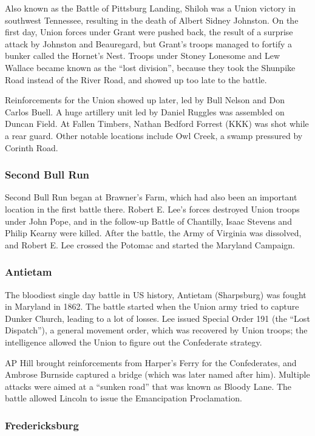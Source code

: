 Also known as the Battle of Pittsburg Landing, Shiloh was a Union victory in southwest Tennessee,
resulting in the death of Albert Sidney Johnston.
On the first day, Union forces under Grant were pushed back,
the result of a surprise attack by Johnston and Beauregard,
but Grant's troops managed to fortify a bunker called the Hornet's Nest.
Troops under Stoney Lonesome and Lew Wallace became known as the ``lost division'',
because they took the Shunpike Road instead of the River Road,
and showed up too late to the battle.

Reinforcements for the Union showed up later, led by Bull Nelson and Don Carlos Buell.
A huge artillery unit led by Daniel Ruggles was assembled on Duncan Field.
At Fallen Timbers, Nathan Bedford Forrest (KKK) was shot while a rear guard.
Other notable locations include Owl Creek, a swamp pressured by Corinth Road.

\subsubsection*{Second Bull Run}

Second Bull Run began at Brawner's Farm, which had also been an important location in the first battle there.
Robert E. Lee's forces destroyed Union troops under John Pope,
and in the follow-up Battle of Chantilly, Isaac Stevens and Philip Kearny were killed.
After the battle, the Army of Virginia was dissolved,
and Robert E. Lee crossed the Potomac and started the Maryland Campaign.

\subsubsection*{Antietam}

The bloodiest single day battle in US history, Antietam (Sharpsburg) was fought in Maryland in 1862.
The battle started when the Union army tried to capture Dunker Church, leading to a lot of losses.
Lee issued Special Order 191 (the ``Lost Dispatch''),
a general movement order, which was recovered by Union troops;
the intelligence allowed the Union to figure out the Confederate strategy.

AP Hill brought reinforcements from Harper's Ferry for the Confederates,
and Ambrose Burnside captured a bridge (which was later named after him).
Multiple attacks were aimed at a ``sunken road'' that was known as Bloody Lane.
The battle allowed Lincoln to issue the Emancipation Proclamation.

\subsubsection*{Fredericksburg}

